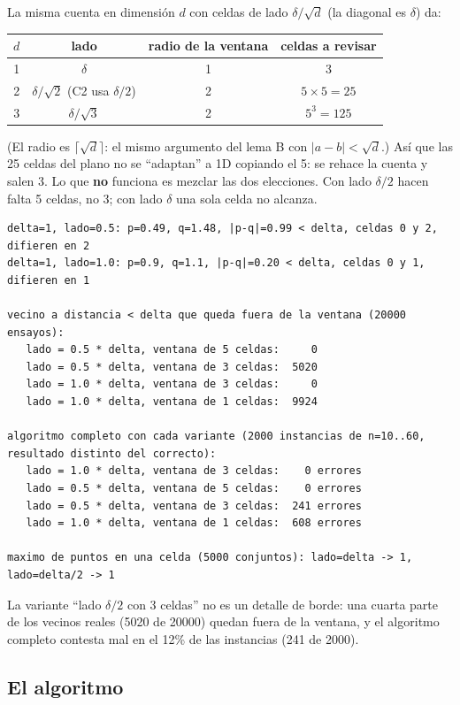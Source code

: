\documentclass[11pt]{article}
\begin{document}
La misma cuenta en dimensión $d$ con celdas de lado $\delta/\sqrt d$ (la diagonal es $\delta$) da:
\begin{center}\small
\begin{tabular}{@{}cccc@{}}
\toprule
$d$ & lado & radio de la ventana & celdas a revisar\\
\midrule
1 & $\delta$ & 1 & 3\\
2 & $\delta/\sqrt2$ (C2 usa $\delta/2$) & 2 & $5\times5=25$\\
3 & $\delta/\sqrt3$ & 2 & $5^3=125$\\
\bottomrule
\end{tabular}
\end{center}
(El radio es $\lceil\sqrt d\rceil$: el mismo argumento del lema B con $|a-b|<\sqrt d$.) Así que las 25
celdas del plano no se ``adaptan'' a 1D copiando el 5: se rehace la cuenta y salen 3. Lo que \textbf{no}
funciona es mezclar las dos elecciones. Con lado $\delta/2$ hacen falta 5 celdas, no 3; con lado $\delta$
una sola celda no alcanza.
\begin{lstlisting}[style=salida,basicstyle=\ttfamily\footnotesize\color{black}]
delta=1, lado=0.5: p=0.49, q=1.48, |p-q|=0.99 < delta, celdas 0 y 2, difieren en 2
delta=1, lado=1.0: p=0.9, q=1.1, |p-q|=0.20 < delta, celdas 0 y 1, difieren en 1

vecino a distancia < delta que queda fuera de la ventana (20000 ensayos):
   lado = 0.5 * delta, ventana de 5 celdas:     0
   lado = 0.5 * delta, ventana de 3 celdas:  5020
   lado = 1.0 * delta, ventana de 3 celdas:     0
   lado = 1.0 * delta, ventana de 1 celdas:  9924

algoritmo completo con cada variante (2000 instancias de n=10..60, resultado distinto del correcto):
   lado = 1.0 * delta, ventana de 3 celdas:    0 errores
   lado = 0.5 * delta, ventana de 5 celdas:    0 errores
   lado = 0.5 * delta, ventana de 3 celdas:  241 errores
   lado = 1.0 * delta, ventana de 1 celdas:  608 errores

maximo de puntos en una celda (5000 conjuntos): lado=delta -> 1, lado=delta/2 -> 1
\end{lstlisting}
La variante ``lado $\delta/2$ con 3 celdas'' no es un detalle de borde: una cuarta parte de los vecinos
reales (5020 de 20000) quedan fuera de la ventana, y el algoritmo completo contesta mal en el 12\% de las
instancias (241 de 2000).

\subsection{El algoritmo}
\end{document}
